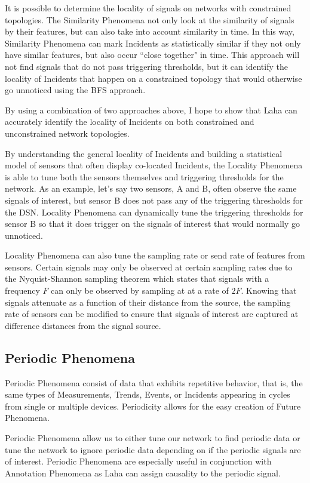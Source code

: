 It is possible to determine the locality of signals on networks with constrained topologies. The Similarity Phenomena not only look at the similarity of signals by their features, but can also take into account similarity in time. In this way, Similarity Phenomena can mark Incidents as statistically similar if they not only have similar features, but also occur ``close together" in time. This approach will not find signals that do not pass triggering thresholds, but it can identify the locality of Incidents that happen on a constrained topology that would otherwise go unnoticed using the BFS approach.

By using a combination of two approaches above, I hope to show that Laha can accurately identify the locality of Incidents on both constrained and unconstrained network topologies.

By understanding the general locality of Incidents and building a statistical model of sensors that often display co-located Incidents, the Locality Phenomena is able to tune both the sensors themselves and triggering thresholds for the network. As an example, let's say two sensors, A and B, often observe the same signals of interest, but sensor B does not pass any of the triggering thresholds for the DSN. Locality Phenomena can dynamically tune the triggering thresholds for sensor B so that it does trigger on the signals of interest that would normally go unnoticed.

Locality Phenomena can also tune the sampling rate or send rate of features from sensors. Certain signals may only be observed at certain sampling rates due to the Nyquist-Shannon sampling theorem\cite{landau1967sampling} which states that signals with a frequency $F$ can only be observed by sampling at at a rate of $2F$. Knowing that signals attenuate as a function of their distance from the source, the sampling rate of sensors can be modified to ensure that signals of interest are captured at difference distances from the signal source.

\subsection{Periodic Phenomena} \label{subsec:periodicity-phenomena}
Periodic Phenomena consist of data that exhibits repetitive behavior, that is, the same types of Measurements, Trends, Events, or Incidents appearing in cycles from single or multiple devices. Periodicity allows for the easy creation of Future Phenomena.

Periodic Phenomena allow us to either tune our network to find periodic data or tune the network to ignore periodic data depending on if the periodic signals are of interest. Periodic Phenomena are especially useful in conjunction with Annotation Phenomena as Laha can assign causality to the periodic signal.

